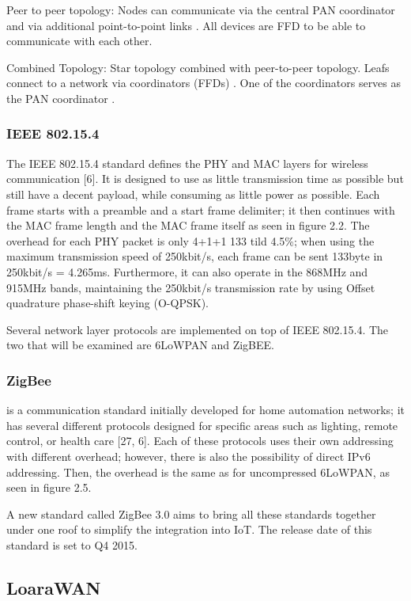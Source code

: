 Peer to peer topology:
	Nodes can communicate via the central PAN coordinator and via additional point-to-point links .
All devices are FFD to be able to communicate with each other.


Combined Topology:
	Star topology combined with peer-to-peer topology.
Leafs connect to a network via coordinators (FFDs) .
One of the coordinators serves as the PAN coordinator .



\subsubsection*{IEEE 802.15.4}
The IEEE 802.15.4 standard defines the PHY and MAC layers for wireless communication [6].
It is designed to use as little transmission time as possible but still have a decent payload,
	while consuming as little power as possible.
Each frame starts with a preamble and a start frame delimiter;
	it then continues with the MAC frame length and the MAC frame itself as seen in figure 2.2.
The overhead for each PHY packet is only 4+1+1 133 tild 4.5\%;
	when
using the maximum transmission speed of 250kbit/s,
	each frame can be sent 133byte in 250kbit/s = 4.265ms.
Furthermore,
	it can also operate in the 868MHz and 915MHz bands,
	maintaining the 250kbit/s transmission rate by using Offset quadrature phase-shift keying (O-QPSK).

Several network layer protocols are implemented on top of IEEE 802.15.4.
The two that will be examined are 6LoWPAN and ZigBEE.

\subsubsection{ZigBee} 
is a communication standard initially developed for home automation
networks; it has several different protocols designed for specific areas such
as lighting, remote control, or health care [27, 6]. Each of these protocols
uses their own addressing with different overhead; however, there is also the
possibility of direct IPv6 addressing. Then, the overhead is the same as for
uncompressed 6LoWPAN, as seen in figure 2.5.

A new standard called ZigBee 3.0 aims to bring all these standards together under one roof to simplify the integration into IoT.
The release date of this standard is set to Q4 2015.

\subsection{LoaraWAN}


